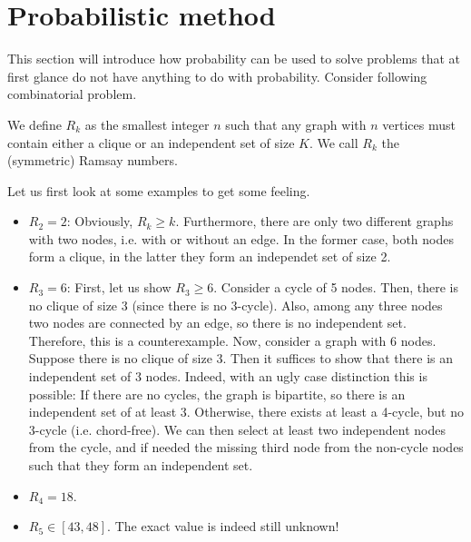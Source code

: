 
\section{Probabilistic method}
This section will introduce how probability can be used to solve problems that at first glance do not have anything to do with probability.
Consider following combinatorial problem.
\begin{definition}
    We define $R_k$ as the smallest integer $n$ such that any graph with $n$ vertices must contain either a clique or an independent set of size $K$.
    We call $R_k$ the (symmetric) Ramsay numbers.
\end{definition}
Let us first look at some examples to get some feeling.
\begin{example}
    \begin{itemize}
        The first few Ramsay numbers are given as
        \item $R_2=2$: Obviously, $R_k \geq k$. Furthermore, there are only two different graphs with two nodes, i.e. with or without an edge.
              In the former case, both nodes form a clique, in the latter they form an independet set of size 2.
        \item $R_3=6$: First, let us show $R_3 \geq 6$. Consider a cycle of 5 nodes. Then, there is no clique of size 3 (since there is no 3-cycle).
              Also, among any three nodes two nodes are connected by an edge, so there is no independent set. Therefore, this is a counterexample.
              Now, consider a graph with 6 nodes. Suppose there is no clique of size 3. Then it suffices to show that there is an independent set of 3 nodes.
              Indeed, with an ugly case distinction this is possible: If there are no cycles, the graph is bipartite, so there is an independent set of at least 3.
              Otherwise, there exists at least a 4-cycle, but no 3-cycle (i.e. chord-free).
              We can then select at least two independent nodes from the cycle, and if needed the missing third node from the non-cycle nodes such that they form an independent set.
        \item $R_4 = 18$.
        \item $R_5 \in [43, 48]$. The exact value is indeed still unknown!
    \end{itemize}
\end{example}
